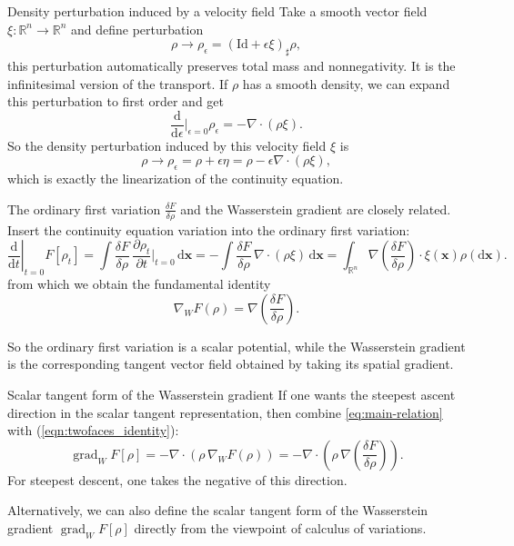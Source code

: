 \documentclass[11pt]{book}
\newcommand{\reff}[1]{{\rm (\ref{#1})}}
\newcommand{\Rn}{\mathbb{R}^n}
\newcommand{\grad}{\operatorname{grad}}
\newcommand{\R}{\mathbb{R}}
\newcommand{\bx}{\mathbf x}
\newcommand{\dd}{\mathrm{d}}
\newcommand{\gradw}{\nabla_{\!W}}
\newcommand{\deldrho}[1]{\frac{\delta #1}{\delta\rho}}
\begin{document}
\begin{keybox}{Density perturbation induced by a velocity field}
Take a smooth vector field $\xi: \Rn \rightarrow \Rn$ and define perturbation
\[
\rho \rightarrow \rho_{\epsilon} =  (\mathrm{Id} + \epsilon \xi)_{\sharp}\rho,
\]
this perturbation automatically preserves total mass and nonnegativity. It is the infinitesimal version of the transport. If $\rho$ has a smooth density, we can expand this perturbation to first order and get
\[
\frac{\dd}{\dd\epsilon} \Big|_{\epsilon = 0} \rho_{\epsilon}  = -\nabla \cdot (\rho \xi).
\]
So the density perturbation induced by this velocity field $\xi$ is
\[
\rho \rightarrow \rho_{\epsilon} =  \rho + \epsilon \eta = \rho  - \epsilon \nabla\cdot(\rho\xi),
\]
which is exactly the linearization of the continuity equation.
\end{keybox}



The ordinary first variation $\frac{\delta F}{\delta \rho}$ and the Wasserstein gradient are closely related. Insert the continuity equation variation into the ordinary first variation:
\[
\left.\frac{\dd}{\dd t}\right|_{t=0} F[\rho_t]
= \int \deldrho{F}\,\frac{\partial \rho_t}{\partial t}\Big|_{t=0}\,\dd \bx
= -\int \deldrho{F}\,\nabla\cdot(\rho \xi)\,\dd \bx 
= \int_{\R^n} \nabla\!\left(\deldrho{F}\right)\cdot \xi(\bx) \rho(\mathrm{d}\bx).
\]
from which we obtain the fundamental identity
\begin{equation}
\boxed{\nabla_W F(\rho)=\nabla\!\left(\deldrho{F}\right).}
\label{eq:main-relation}
\end{equation}

So the ordinary first variation is a scalar potential, while the Wasserstein gradient is the corresponding tangent vector field obtained by taking its spatial gradient.

\begin{keybox}{Scalar tangent form of the Wasserstein gradient}
If one wants the steepest ascent direction in the scalar tangent representation, then combine \eqref{eq:main-relation} with \reff{eqn:twofaces_identity}:
\[
\grad_W F[\rho] = -\nabla\cdot\!\left(\rho\,\gradw F(\rho)\right)
= -\nabla\cdot\!\left(\rho\,\nabla\!\left(\deldrho{F}\right)\right).
\]
For steepest descent, one takes the negative of this direction.
\end{keybox}


Alternatively, we can also define the scalar tangent form of the Wasserstein gradient $\grad_W F[\rho]$ directly from the viewpoint of calculus of variations.
\end{document}
